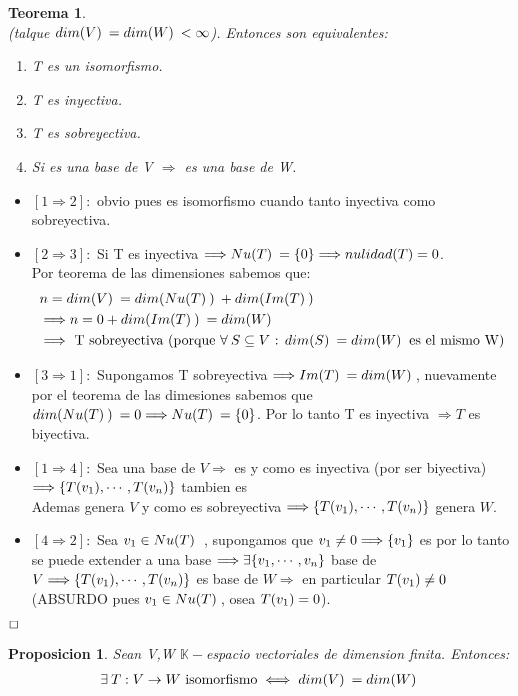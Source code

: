 \documentclass[]{article}
\newtheorem{theorem}{Teorema}
\newtheorem{proposition}{Proposicion}[theorem]
\newenvironment{proof}{\noindent{\bf Prueba:}}{$\hfill \Box$ \vspace{10pt}}
\newcommand{\K}{
    \mathbb{K}
}
\newcommand{\ida}{\Longrightarrow}
\begin{document}
\begin{theorem}
    \\
    (talque $\text{$dim(V)$}\:=\text{$dim(W)$}\:<\infty$). Entonces son equivalentes:
    \begin{enumerate}
        \item T es un isomorfismo.
        \item T es inyectiva.
        \item T es sobreyectiva.
        \item Si  es una base de V $\ida$  es una base de W.
    \end{enumerate}
\end{theorem}
\begin{proof}
    \begin{itemize}
        \item $[1 \ida 2]:$ obvio pues es isomorfismo cuando tanto inyectiva como sobreyectiva.
        \item $[2 \ida 3]:$ Si T es inyectiva $\ida \N=\conjunto{0}\ida nulidad(T)=0$.\\
        Por teorema de las dimensiones sabemos que:
        \begin{align*}
            &n=\dm{V}=\dm{\N}+\dm{\I}\\
            &\ida n = 0 + \dm{\I} = \dm{W}\\
            &\ida \text{ T sobreyectiva (porque $\forall\: \incluye{S}{V}$ : $\dm{S}=\dm{W}$ es el mismo W)}
        \end{align*}
        \item $[3 \ida 1]:$ Supongamos T sobreyectiva $\ida\I=\dm{W}$, nuevamente por el teorema de las dimesiones
        sabemos que $\dm{\N}=0 \ida \N=\conjunto{0}$. Por lo tanto T es inyectiva $\ida T$ es biyectiva.
        \item $[1 \ida 4]:$ Sea  una base de $V \ida$  es \li
        y como es inyectiva (por ser biyectiva) $\ida \conjunto{\T{v_1},\cdots,\T{v_n}}$ tambien es \li\\
        Ademas  genera $V$ y como es sobreyectiva $\ida \conjunto{\T{v_1},\cdots,\T{v_n}}$
        genera $W$.
        \item $[4 \ida 2]:$ Sea $\text{$v_{1}$} \in \text{$Nu(T)$}\:$ , supongamos que $\vc{1}\neq0 \ida \conjunto{\vc{1}}$ es \li por lo tanto
        se puede extender a una base $\ida \exists \conjunto{\vc{1},\cdots,\vc{n}}$ base de $V
        \ida \conjunto{\T{\vc{1}},\cdots,\T{\vc{n}}}$ es base de $W \ida$ en particular $\text{$T({\text{$v_{1}$}})$}\neq0$ \:
        (ABSURDO pues $\text{$v_{1}$}\in\text{$Nu(T)$}\:$, osea $\text{$T({\text{$v_{1}$}})$}=0$).
    \end{itemize}
\end{proof}
\begin{proposition}
    Sean V,W $\K-$espacio vectoriales de dimension finita. Entonces:
    \begin{align*}
        \exists\: T:V\rightarrow W \text{  isomorfismo} \iff \text{$dim(V)$}\:=\text{$dim(W)$}\:
    \end{align*}
\end{proposition}
\end{document}
